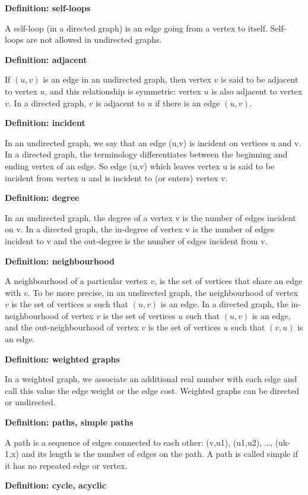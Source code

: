 \documentclass[11pt]{article}
\begin{document}
\textbf{Definition: self-loops}

A self-loop (in a directed graph) is an edge going from a vertex to itself. Self-loops are not allowed in undirected graphs.

\textbf{Definition: adjacent}

If $(u,v)$ is an edge in an undirected graph, then vertex $v$ is said to be adjacent to vertex $u$, and this relationship is symmetric: vertex $u$ is also adjacent to vertex $v$. In a directed graph, $v$ is adjacent to $u$ if there is an edge $(u,v)$.

\textbf{Definition: incident}

In an undirected graph, we say that an edge (u,v) is incident on vertices u and v. In a directed graph, the terminology differentiates between the beginning and ending vertex of an edge. So edge (u,v) which leaves vertex u is said to be incident from vertex u and is incident to (or enters) vertex v.

\textbf{Definition: degree}

In an undirected graph, the degree of a vertex v is the number of edges incident on v. In a directed graph, the in-degree of vertex v is the number of edges incident to v and the out-degree is the number of edges incident from v.

\textbf{Definition: neighbourhood}

A neighbourhood of a particular vertex $v$, is the set of vertices that share an edge with $v$. To be more precise, in an undirected graph, the neighbourhood of vertex $v$ is the set of vertices $u$ such that $(u,v)$ is an edge. In a directed graph, the in-neighbourhood of vertex $v$ is the set of vertices $u$ such that $(u,v)$ is an edge, and the out-neighbourhood of vertex $v$ is the set of vertices $u$ such that $(v,u)$ is an edge.

\textbf{Definition: weighted graphs}

In a weighted graph, we associate an additional real number with each edge and call this value the edge weight or the edge cost. Weighted graphs can be directed or undirected.

\textbf{Definition: paths, simple paths}

A path is a sequence of edges connected to each other: (v,u1), (u1,u2), …, (uk-1,x) and its length is the number of edges on the path. A path is called simple if it has no repeated edge or vertex. 

\textbf{Definition: cycle, acyclic}
\end{document}
